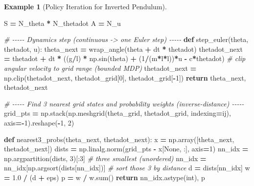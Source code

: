 \documentclass[
]{book}
\newenvironment{Shaded}{\begin{snugshade}}{\end{snugshade}}
\newcommand{\BuiltInTok}[1]{#1}
\newcommand{\CommentTok}[1]{\textcolor[rgb]{0.56,0.35,0.01}{\textit{#1}}}
\newcommand{\ControlFlowTok}[1]{\textcolor[rgb]{0.13,0.29,0.53}{\textbf{#1}}}
\newcommand{\DecValTok}[1]{\textcolor[rgb]{0.00,0.00,0.81}{#1}}
\newcommand{\FloatTok}[1]{\textcolor[rgb]{0.00,0.00,0.81}{#1}}
\newcommand{\KeywordTok}[1]{\textcolor[rgb]{0.13,0.29,0.53}{\textbf{#1}}}
\newcommand{\NormalTok}[1]{#1}
\newcommand{\OperatorTok}[1]{\textcolor[rgb]{0.81,0.36,0.00}{\textbf{#1}}}
\newcommand{\StringTok}[1]{\textcolor[rgb]{0.31,0.60,0.02}{#1}}
\newcommand{\VariableTok}[1]{\textcolor[rgb]{0.00,0.00,0.00}{#1}}
\theoremstyle{definition}
\theoremstyle{definition}
\newtheorem{example}{Example}[chapter]
\theoremstyle{definition}
\theoremstyle{definition}
\theoremstyle{remark}
\begin{document}
\begin{example}[Policy Iteration for Inverted Pendulum]
\begin{Shaded}
\begin{Highlighting}[]
\NormalTok{S }\OperatorTok{=}\NormalTok{ N\_theta }\OperatorTok{*}\NormalTok{ N\_thetadot}
\NormalTok{A }\OperatorTok{=}\NormalTok{ N\_u}

\CommentTok{\# {-}{-}{-}{-}{-} Dynamics step (continuous {-}\textgreater{} one Euler step) {-}{-}{-}{-}{-}}
\KeywordTok{def}\NormalTok{ step\_euler(theta, thetadot, u):}
\NormalTok{    theta\_next }\OperatorTok{=}\NormalTok{ wrap\_angle(theta }\OperatorTok{+}\NormalTok{ dt }\OperatorTok{*}\NormalTok{ thetadot)}
\NormalTok{    thetadot\_next }\OperatorTok{=}\NormalTok{ thetadot }\OperatorTok{+}\NormalTok{ dt }\OperatorTok{*}\NormalTok{ ((g}\OperatorTok{/}\NormalTok{l) }\OperatorTok{*}\NormalTok{ np.sin(theta) }\OperatorTok{+}\NormalTok{ (}\DecValTok{1}\OperatorTok{/}\NormalTok{(m}\OperatorTok{*}\NormalTok{l}\OperatorTok{*}\NormalTok{l))}\OperatorTok{*}\NormalTok{u }\OperatorTok{{-}}\NormalTok{ c}\OperatorTok{*}\NormalTok{thetadot)}
    \CommentTok{\# clip angular velocity to grid range (bounded MDP)}
\NormalTok{    thetadot\_next }\OperatorTok{=}\NormalTok{ np.clip(thetadot\_next, thetadot\_grid[}\DecValTok{0}\NormalTok{], thetadot\_grid[}\OperatorTok{{-}}\DecValTok{1}\NormalTok{])}
    \ControlFlowTok{return}\NormalTok{ theta\_next, thetadot\_next}

\CommentTok{\# {-}{-}{-}{-}{-} Find 3 nearest grid states and probability weights (inverse{-}distance) {-}{-}{-}{-}{-}}
\NormalTok{grid\_pts }\OperatorTok{=}\NormalTok{ np.stack(np.meshgrid(theta\_grid, thetadot\_grid, indexing}\OperatorTok{=}\StringTok{\textquotesingle{}ij\textquotesingle{}}\NormalTok{), axis}\OperatorTok{={-}}\DecValTok{1}\NormalTok{).reshape(}\OperatorTok{{-}}\DecValTok{1}\NormalTok{, }\DecValTok{2}\NormalTok{)}

\KeywordTok{def}\NormalTok{ nearest3\_probs(theta\_next, thetadot\_next):}
\NormalTok{    x }\OperatorTok{=}\NormalTok{ np.array([theta\_next, thetadot\_next])}
\NormalTok{    dists }\OperatorTok{=}\NormalTok{ np.linalg.norm(grid\_pts }\OperatorTok{{-}}\NormalTok{ x[}\VariableTok{None}\NormalTok{, :], axis}\OperatorTok{=}\DecValTok{1}\NormalTok{)}
\NormalTok{    nn\_idx }\OperatorTok{=}\NormalTok{ np.argpartition(dists, }\DecValTok{3}\NormalTok{)[:}\DecValTok{3}\NormalTok{]      }\CommentTok{\# three smallest (unordered)}
\NormalTok{    nn\_idx }\OperatorTok{=}\NormalTok{ nn\_idx[np.argsort(dists[nn\_idx])]  }\CommentTok{\# sort those 3 by distance}
\NormalTok{    d }\OperatorTok{=}\NormalTok{ dists[nn\_idx]}
\NormalTok{    w }\OperatorTok{=} \FloatTok{1.0} \OperatorTok{/}\NormalTok{ (d }\OperatorTok{+}\NormalTok{ eps)}
\NormalTok{    p }\OperatorTok{=}\NormalTok{ w }\OperatorTok{/}\NormalTok{ w.}\BuiltInTok{sum}\NormalTok{()}
    \ControlFlowTok{return}\NormalTok{ nn\_idx.astype(}\BuiltInTok{int}\NormalTok{), p}


\end{Highlighting}
\end{Shaded}
\end{example}
\end{document}
